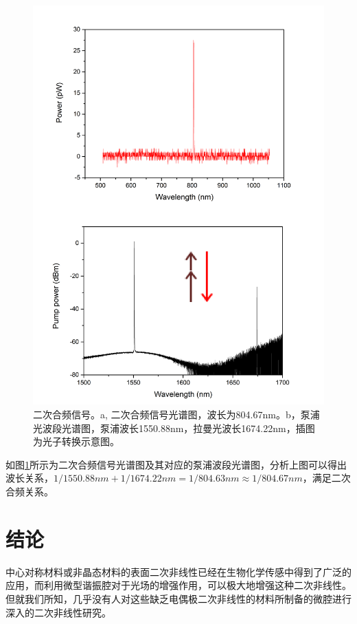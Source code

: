 \documentclass[UTF8,a4paper,cs4size,hyperref]{ctexart}
\begin{document}
\begin{figure}
\centering
\includegraphics[width=14cm ]{FigRamanSF}
\caption{二次合频信号。a, 二次合频信号光谱图，波长为804.67nm。b，泵浦光波段光谱图，泵浦波长1550.88nm，拉曼光波长1674.22nm，插图为光子转换示意图。}
\label{pic:FigRamanSF}
\end{figure}

如图\ref{pic:FigRamanSF}所示为二次合频信号光谱图及其对应的泵浦波段光谱图，分析上图可以得出波长关系，$1/1550.88nm+1/1674.22nm = 1/804.63nm \approx 1/804.67nm$，满足二次合频关系。

\newpage
\section{结论}
\label{sec:conclu}

中心对称材料或非晶态材料的表面二次非线性已经在生物化学传感中得到了广泛的应用，而利用微型谐振腔对于光场的增强作用，可以极大地增强这种二次非线性。但就我们所知，几乎没有人对这些缺乏电偶极二次非线性的材料所制备的微腔进行深入的二次非线性研究。
\end{document}
